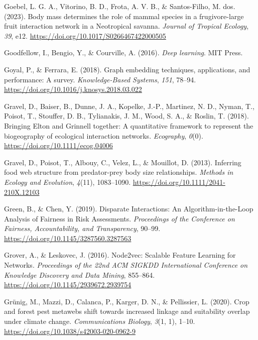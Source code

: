 \documentclass[11pt]{article}
\newlength{\cslhangindent}
\newenvironment{CSLReferences}[2] %
 {%
  \setlength{\parindent}{0pt}
  \ifodd #1 \everypar{\setlength{\hangindent}{\cslhangindent}}\ignorespaces\fi
  \ifnum #2 > 0
  \setlength{\parskip}{#2\baselineskip}
  \fi
 }%
 {}
\begin{document}
\begin{CSLReferences}{1}{0}
\leavevmode{}%
Goebel, L. G. A., Vitorino, B. D., Frota, A. V. B., \& Santos-Filho, M.
dos. (2023). Body mass determines the role of mammal species in a
frugivore-large fruit interaction network in a Neotropical savanna.
\emph{Journal of Tropical Ecology}, \emph{39}, e12.
\url{https://doi.org/10.1017/S0266467422000505}

\leavevmode{}%
Goodfellow, I., Bengio, Y., \& Courville, A. (2016). \emph{Deep
learning}. MIT Press.

\leavevmode{}%
Goyal, P., \& Ferrara, E. (2018). Graph embedding techniques,
applications, and performance: A survey. \emph{Knowledge-Based Systems},
\emph{151}, 78--94. \url{https://doi.org/10.1016/j.knosys.2018.03.022}

\leavevmode{}%
Gravel, D., Baiser, B., Dunne, J. A., Kopelke, J.-P., Martinez, N. D.,
Nyman, T., Poisot, T., Stouffer, D. B., Tylianakis, J. M., Wood, S. A.,
\& Roslin, T. (2018). Bringing Elton and Grinnell together: A
quantitative framework to represent the biogeography of ecological
interaction networks. \emph{Ecography}, \emph{0}(0).
\url{https://doi.org/10.1111/ecog.04006}

\leavevmode{}%
Gravel, D., Poisot, T., Albouy, C., Velez, L., \& Mouillot, D. (2013).
Inferring food web structure from predator-prey body size relationships.
\emph{Methods in Ecology and Evolution}, \emph{4}(11), 1083--1090.
\url{https://doi.org/10.1111/2041-210X.12103}

\leavevmode{}%
Green, B., \& Chen, Y. (2019). Disparate Interactions: An
Algorithm-in-the-Loop Analysis of Fairness in Risk Assessments.
\emph{Proceedings of the Conference on Fairness, Accountability, and
Transparency}, 90--99. \url{https://doi.org/10.1145/3287560.3287563}

\leavevmode{}%
Grover, A., \& Leskovec, J. (2016). Node2vec: Scalable Feature Learning
for Networks. \emph{Proceedings of the 22nd ACM SIGKDD International
Conference on Knowledge Discovery and Data Mining}, 855--864.
\url{https://doi.org/10.1145/2939672.2939754}

\leavevmode{}%
Grünig, M., Mazzi, D., Calanca, P., Karger, D. N., \& Pellissier, L.
(2020). Crop and forest pest metawebs shift towards increased linkage
and suitability overlap under climate change. \emph{Communications
Biology}, \emph{3}(1, 1), 1--10.
\url{https://doi.org/10.1038/s42003-020-0962-9}


\end{CSLReferences}
\end{document}
